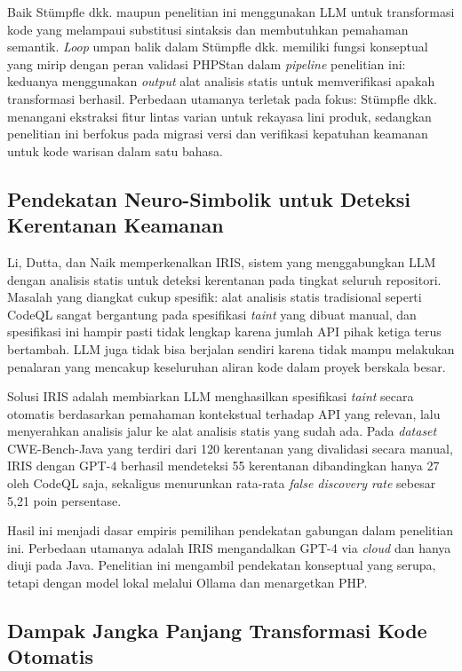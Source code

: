     Baik St\"{u}mpfle dkk. maupun penelitian ini menggunakan LLM untuk transformasi kode yang melampaui substitusi sintaksis dan membutuhkan pemahaman semantik. \textit{Loop} umpan balik dalam St\"{u}mpfle dkk. memiliki fungsi konseptual yang mirip dengan peran validasi PHPStan dalam \textit{pipeline} penelitian ini: keduanya menggunakan \textit{output} alat analisis statis untuk memverifikasi apakah transformasi berhasil. Perbedaan utamanya terletak pada fokus: St\"{u}mpfle dkk. menangani ekstraksi fitur lintas varian untuk rekayasa lini produk, sedangkan penelitian ini berfokus pada migrasi versi dan verifikasi kepatuhan keamanan untuk kode warisan dalam satu bahasa.

    \subsection{Pendekatan Neuro-Simbolik untuk Deteksi Kerentanan Keamanan}

    Li, Dutta, dan Naik \cite{li2025iris} memperkenalkan IRIS, sistem yang menggabungkan LLM dengan analisis statis untuk deteksi kerentanan pada tingkat seluruh repositori. Masalah yang diangkat cukup spesifik: alat analisis statis tradisional seperti CodeQL sangat bergantung pada spesifikasi \textit{taint} yang dibuat manual, dan spesifikasi ini hampir pasti tidak lengkap karena jumlah API pihak ketiga terus bertambah. LLM juga tidak bisa berjalan sendiri karena tidak mampu melakukan penalaran yang mencakup keseluruhan aliran kode dalam proyek berskala besar.

    Solusi IRIS adalah membiarkan LLM menghasilkan spesifikasi \textit{taint} secara otomatis berdasarkan pemahaman kontekstual terhadap API yang relevan, lalu menyerahkan analisis jalur ke alat analisis statis yang sudah ada. Pada \textit{dataset} CWE-Bench-Java yang terdiri dari 120 kerentanan yang divalidasi secara manual, IRIS dengan GPT-4 berhasil mendeteksi 55 kerentanan dibandingkan hanya 27 oleh CodeQL saja, sekaligus menurunkan rata-rata \textit{false discovery rate} sebesar 5,21 poin persentase.

    Hasil ini menjadi dasar empiris pemilihan pendekatan gabungan dalam penelitian ini. Perbedaan utamanya adalah IRIS mengandalkan GPT-4 via \textit{cloud} dan hanya diuji pada Java. Penelitian ini mengambil pendekatan konseptual yang serupa, tetapi dengan model lokal melalui Ollama dan menargetkan PHP.

    \subsection{Dampak Jangka Panjang Transformasi Kode Otomatis}

